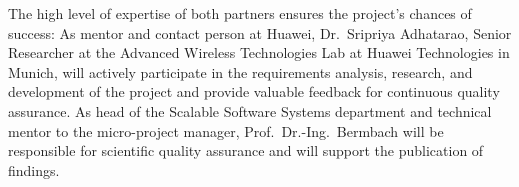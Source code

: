 The high level of expertise of both partners ensures the project's chances of success:
As mentor and contact person at Huawei, Dr.~Sripriya Adhatarao, Senior Researcher at the Advanced Wireless Technologies Lab at Huawei Technologies in Munich, will actively participate in the requirements analysis, research, and development of the project and provide valuable feedback for continuous quality assurance.
As head of the Scalable Software Systems department and technical mentor to the micro-project manager, Prof.~Dr.-Ing.~Bermbach will be responsible for scientific quality assurance and will support the publication of findings.
